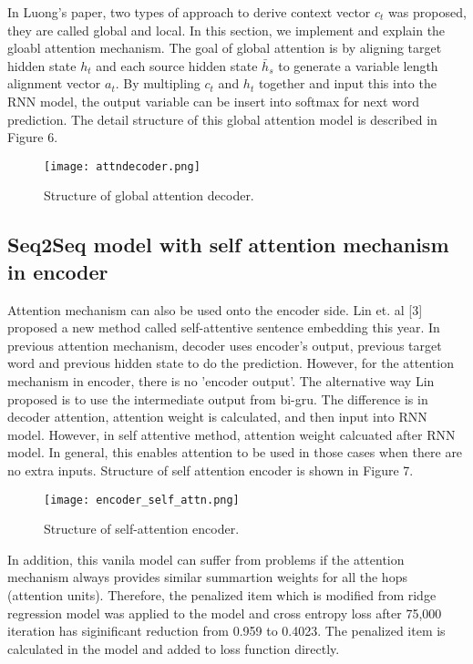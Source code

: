 \documentclass{article}
\begin{document}
In Luong's paper, two types of approach to derive context vector $c_t$ was proposed, they are called global and local. In this section, we implement and explain the gloabl attention mechanism. The goal of global attention is by aligning target hidden state $h_t$ and each source hidden state $\bar{h}_s$ to generate a variable length alignment vector $a_t$. By multipling $c_t$ and $h_t$ together and input this into the RNN model, the output variable can be insert into softmax for next word prediction. The detail structure of this global attention model is described in Figure 6.

\begin{figure}[h]
  \centering
  \texttt{[image: attndecoder.png]}
  \caption{Structure of global attention decoder.}
\end{figure}


\subsection{Seq2Seq model with self attention mechanism in encoder}
Attention mechanism can also be used onto the encoder side. Lin et. al [3] proposed a new method called self-attentive sentence embedding this year. In previous attention mechanism, decoder uses encoder's output, previous target word and previous hidden state to do the prediction. However, for the attention mechanism in encoder, there is no 'encoder output'. The alternative way Lin proposed is to use the intermediate output from bi-gru. The difference is in decoder attention, attention weight is calculated, and then input into RNN model. However, in self attentive method, attention weight calcuated after RNN model. In general, this enables attention to be used in those cases when there are no extra inputs. Structure of self attention encoder is shown in Figure 7.

\begin{figure}[h]
  \centering
  \texttt{[image: encoder\_self\_attn.png]}
  \caption{Structure of self-attention encoder.}
\end{figure}
 
In addition, this vanila model can suffer from problems if the attention mechanism always provides similar summartion weights for all the hops (attention units). Therefore, the penalized item which is modified from ridge regression model was applied to the model and cross entropy loss after 75,000 iteration has siginificant reduction from 0.959 to 0.4023. The penalized item is calculated in the model and added to loss function directly.
\end{document}
